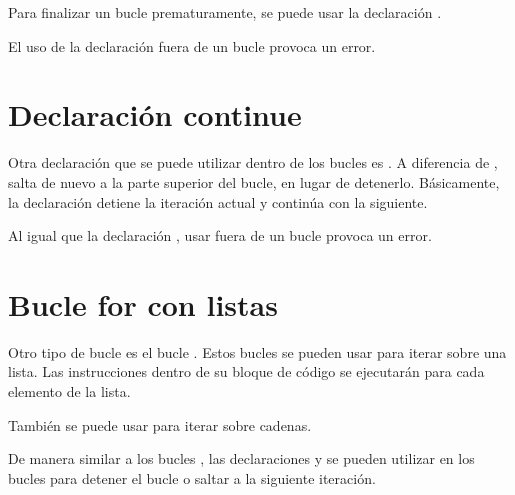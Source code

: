 Para finalizar un bucle  prematuramente, se puede usar la declaración .


El uso de la declaración  fuera de un bucle provoca un error.


\section{Declaración continue}

Otra declaración que se puede utilizar dentro de los bucles es .
A diferencia de ,  salta de nuevo a la parte superior del bucle, en lugar de detenerlo.
Básicamente, la declaración  detiene la iteración actual y continúa con la siguiente.


Al igual que la declaración , usar  fuera de un bucle provoca un error.


\section{Bucle for con listas}

Otro tipo de bucle es el bucle .
Estos bucles se pueden usar para iterar sobre una lista.
Las instrucciones dentro de su bloque de código se ejecutarán para cada elemento de la lista.


También se puede usar para iterar sobre cadenas.


De manera similar a los bucles , las declaraciones  y  se pueden utilizar en los bucles  para detener el bucle o saltar a la siguiente iteración.


